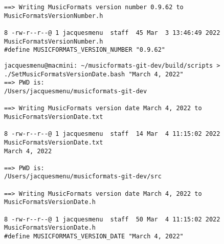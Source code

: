 \begin{enumerate}
\begin{lstlisting}[language=TerminalSmall]
==> Writing MusicFormats version number 0.9.62 to MusicFormatsVersionNumber.h

8 -rw-r--r--@ 1 jacquesmenu  staff  45 Mar  3 13:46:49 2022 MusicFormatsVersionNumber.h
#define MUSICFORMATS_VERSION_NUMBER "0.9.62"
\end{lstlisting}

\begin{lstlisting}[language=Terminal]
jacquesmenu@macmini: ~/musicformats-git-dev/build/scripts > ./SetMusicFormatsVersionDate.bash "March 4, 2022"
==> PWD is:
/Users/jacquesmenu/musicformats-git-dev

==> Writing MusicFormats version date March 4, 2022 to MusicFormatsVersionDate.txt

8 -rw-r--r--@ 1 jacquesmenu  staff  14 Mar  4 11:15:02 2022 MusicFormatsVersionDate.txt
March 4, 2022

==> PWD is:
/Users/jacquesmenu/musicformats-git-dev/src

==> Writing MusicFormats version date March 4, 2022 to MusicFormatsVersionDate.h

8 -rw-r--r--@ 1 jacquesmenu  staff  50 Mar  4 11:15:02 2022 MusicFormatsVersionDate.h
#define MUSICFORMATS_VERSION_DATE "March 4, 2022"
\end{lstlisting}

\end{enumerate}
